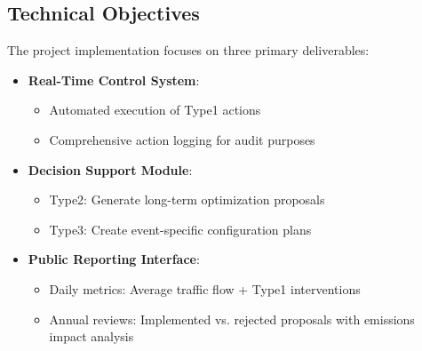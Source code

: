 \documentclass[11.5pt]{article}
\begin{document}
    \subsection{Technical Objectives}
    The project implementation focuses on three primary deliverables:
    \begin{itemize}
        \item \textbf{Real-Time Control System}:
        \begin{itemize}
            \item Automated execution of Type1 actions
            \item Comprehensive action logging for audit purposes
        \end{itemize}
        
        \item \textbf{Decision Support Module}:
        \begin{itemize}
            \item Type2: Generate long-term optimization proposals
            \item Type3: Create event-specific configuration plans
        \end{itemize}
        
        \item \textbf{Public Reporting Interface}:
        \begin{itemize}
            \item Daily metrics: Average traffic flow + Type1 interventions
            \item Annual reviews: Implemented vs. rejected proposals with emissions impact analysis
        \end{itemize}
    \end{itemize}
    
\end{document}
